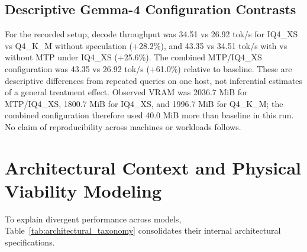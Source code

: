 \documentclass[10pt,a4paper,twocolumn]{article}
\begin{document}
\subsection{Descriptive Gemma-4 Configuration Contrasts}

For the recorded setup, decode throughput was 34.51 vs 26.92 tok/s for IQ4\_XS vs Q4\_K\_M without speculation (+28.2\%), and 43.35 vs 34.51 tok/s with vs without MTP under IQ4\_XS (+25.6\%). The combined MTP/IQ4\_XS configuration was 43.35 vs 26.92 tok/s (+61.0\%) relative to baseline. These are descriptive differences from repeated queries on one host, not inferential estimates of a general treatment effect. Observed VRAM was 2036.7 MiB for MTP/IQ4\_XS, 1800.7 MiB for IQ4\_XS, and 1996.7 MiB for Q4\_K\_M; the combined configuration therefore used 40.0 MiB more than baseline in this run. No claim of reproducibility across machines or workloads follows.

\section{Architectural Context and Physical Viability Modeling}

To explain divergent performance across models, Table~\ref{tab:architectural_taxonomy} consolidates their internal architectural specifications.
\end{document}
